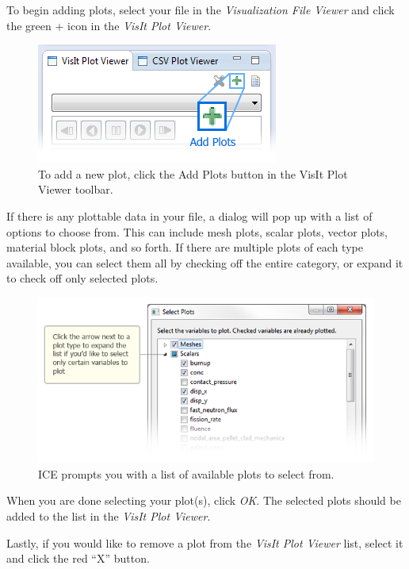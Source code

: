 To begin adding plots, select your file in the \emph{Visualization File
Viewer} and click the green + icon in the \emph{VisIt Plot Viewer}.

\begin{figure}[htbp]
\centering
\includegraphics{figures/ICE_VisItAddPlotButton.png}
\caption{To add a new plot, click the Add Plots button in the VisIt Plot Viewer toolbar. }
\end{figure}

If there is any plottable data in your file, a dialog will pop up with a
list of options to choose from. This can include mesh plots, scalar
plots, vector plots, material block plots, and so forth. If there are
multiple plots of each type available, you can select them all by
checking off the entire category, or expand it to check off only
selected plots.

\begin{figure}[htbp]
\centering
\includegraphics[width=\textwidth]{figures/ICE_VisItPlotSelection.png}
\caption{ICE prompts you with a list of available plots to select from. }
\end{figure}

When you are done selecting your plot(s), click \emph{OK}. The selected
plots should be added to the list in the \emph{VisIt Plot Viewer}.

Lastly, if you would like to remove a plot from the \emph{VisIt Plot
Viewer} list, select it and click the red ``X'' button.


